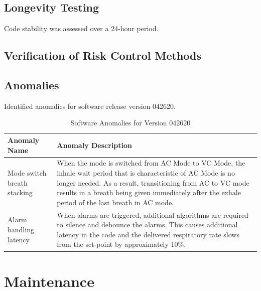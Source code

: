 \documentclass[]{article}
\begin{document}
\subsection{Longevity Testing}

Code stability was assessed over a 24-hour period.

\subsection{Verification of Risk Control Methods}
\label{sect:v_risk}


\subsection{Anomalies}
\label{sect:anomalies}

Identified anomalies for software release version 042620.

\begin{center}
	\begin{table}[h]
		\caption{Software Anomalies for Version 042620}
		\label{tab:sw_anom}
		\begin{tabular}{ |p{4cm}|p{10cm}|}
			
			\hline
			\textbf{Anomaly Name} & \textbf{Anomaly Description}  \\ \hline
			Mode switch breath stacking & When the mode is switched from AC Mode to VC Mode, the inhale wait period that is characteristic of AC Mode is no longer needed.  As a result, transitioning from AC to VC mode results in a breath being given immediately after the exhale period of the last breath in AC mode.\\ \hline 
			Alarm handling latency & When alarms are triggered, additional algorithms are required to silence and debounce the alarms.  This causes additional latency in the code and the delivered respiratory rate slows from the set-point by approximately 10\%.\\ \hline
		
			
		\end{tabular}
	\end{table}	
\end{center}






\clearpage


\section{Maintenance}
\label{sect:maintenance}
\end{document}
